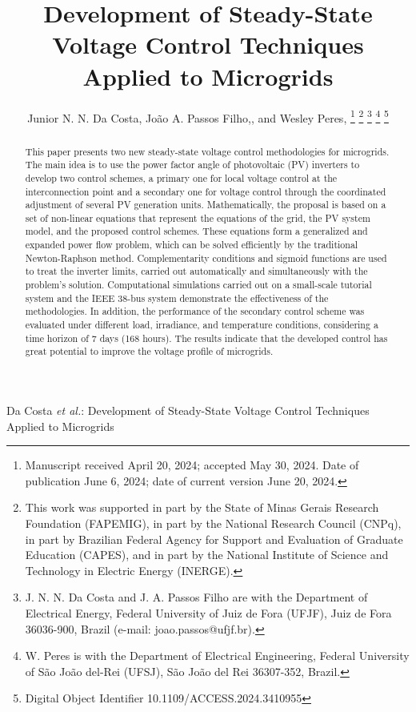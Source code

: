 \documentclass[journal]{IEEEtran}
\begin{document}
	
	\title{Development of Steady-State Voltage Control Techniques Applied to Microgrids}
	\author{Junior N. N. Da Costa, João A. Passos Filho,, and Wesley Peres,
		\thanks{Manuscript received April 20, 2024; accepted May 30, 2024. Date of publication June 6, 2024; date of current version June 20, 2024.}
		\thanks{This work was supported in part by the State of Minas Gerais Research Foundation (FAPEMIG), in part by the National Research Council (CNPq), in part by Brazilian Federal Agency for Support and Evaluation of Graduate Education (CAPES), and in part by the National Institute of Science and Technology in Electric Energy (INERGE).}
		\thanks{J. N. N. Da Costa and J. A. Passos Filho are with the Department of Electrical Energy, Federal University of Juiz de Fora (UFJF), Juiz de Fora 36036-900, Brazil (e-mail: joao.passos@ufjf.br).}
		\thanks{W. Peres is with the Department of Electrical Engineering, Federal University of São João del-Rei (UFSJ), São João del Rei 36307-352, Brazil.}
		\thanks{Digital Object Identifier 10.1109/ACCESS.2024.3410955}
	}
	
	{Da Costa \MakeLowercase{\textit{et al.}}: Development of Steady-State Voltage Control Techniques Applied to Microgrids}
	
	
	\IEEEpubidadjcol
	
	\maketitle
	
	\begin{abstract}
		This paper presents two new steady-state voltage control methodologies for microgrids. The main idea is to use the power factor angle of photovoltaic (PV) inverters to develop two control schemes, a primary one for local voltage control at the interconnection point and a secondary one for voltage control through the coordinated adjustment of several PV generation units. Mathematically, the proposal is based on a set of non-linear equations that represent the equations of the grid, the PV system model, and the proposed control schemes. These equations form a generalized and expanded power flow problem, which can be solved efficiently by the traditional Newton-Raphson method. Complementarity conditions and sigmoid functions are used to treat the inverter limits, carried out automatically and simultaneously with the problem’s solution. Computational simulations carried out on a small-scale tutorial system and the IEEE 38-bus system demonstrate the effectiveness of the methodologies. In addition, the performance of the secondary control scheme was evaluated under different load, irradiance, and temperature conditions, considering a time horizon of 7 days (168 hours). The results indicate that the developed control has great potential to improve the voltage profile of microgrids.
	\end{abstract}
	
\end{document}
